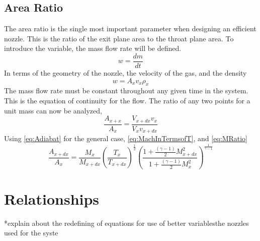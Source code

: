 \subsection{Area Ratio}
The area ratio is the single most important parameter when designing an efficient nozzle. This is the ratio of the exit plane area to the throat plane area. To introduce the variable, the mass flow rate will be defined.
\begin{equation}\label{eq:MassFlow}
w=\frac{dm}{dt}
\end{equation}
In terms of the geometry of the nozzle, the velocity of the gas, and the density
\begin{equation}
w=A_xv_x\rho_x
\end{equation}
The mass flow rate must be constant throughout any given time in the system. This is the equation of continuity for the flow. The ratio of any two points for a unit mass can now be analyzed,
\begin{equation}
\frac{A_{x+x}}{A_x}=\frac{V_{x+dx}v_x}{V_xv_{x+dx}}
\end{equation}
Using \ref{eq:Adiabat} for the general case, \ref{eq:MachInTermsofT}, and \ref{eq:MRatio}
\begin{equation}
\frac{A_{x+dx}}{A_x}=\frac{M_x}{M_{x+dx}}\left(\frac{T_x}{T_{x+dx}}\right)^\frac{1}{2}\left(\frac{1+\frac{(\gamma-1)}{2}M_{x+dx}^2}{1+\frac{(\gamma-1)}{2}M_x^2}\right)^{\frac{1}{\gamma-1}}
\end{equation}

\section{Relationships}
*explain about the redefining of equations for use of better variablesthe nozzles used for the syste